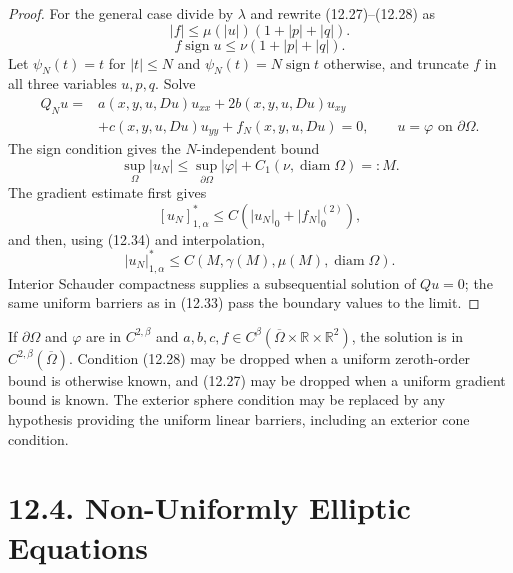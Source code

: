 \begin{proof}
For the general case divide by $\lambda$ and rewrite (12.27)--(12.28) as
\begin{equation}
|f|\le\mu(|u|)(1+|p|+|q|).
\tag{12.34}
\end{equation}
\begin{equation}
f\operatorname{sign}u\le\nu(1+|p|+|q|).
\tag{12.35}
\end{equation}
Let $\psi_N(t)=t$ for $|t|\le N$ and
$\psi_N(t)=N\operatorname{sign}t$ otherwise, and truncate $f$ in all three
variables $u,p,q$.  Solve
\begin{equation}\tag{12.36}
\begin{aligned}
Q_Nu={}&a(x,y,u,Du)u_{xx}+2b(x,y,u,Du)u_{xy}\\
&+c(x,y,u,Du)u_{yy}+f_N(x,y,u,Du)=0,
\qquad u=\varphi\text{ on }\partial\Omega.
\end{aligned}
\end{equation}
The sign condition gives the $N$-independent bound
\begin{equation}\tag{12.37}
\sup_\Omega|u_N|
\le\sup_{\partial\Omega}|\varphi|
+C_1(\nu,\operatorname{diam}\Omega)=:M.
\end{equation}
The gradient estimate first gives
\begin{equation}\tag{12.38}
[u_N]^*_{1,\alpha}
\le C\left(|u_N|_0+|f_N|_0^{(2)}\right),
\end{equation}
and then, using (12.34) and interpolation,
\begin{equation}\tag{12.39}
|u_N|^*_{1,\alpha}
\le C(M,\gamma(M),\mu(M),\operatorname{diam}\Omega).
\end{equation}
Interior Schauder compactness supplies a subsequential solution of $Qu=0$;
the same uniform barriers as in (12.33) pass the boundary values to the
limit.
\end{proof}

If $\partial\Omega$ and $\varphi$ are in $C^{2,\beta}$ and
$a,b,c,f\in C^\beta(\overline\Omega\times\mathbb R\times\mathbb R^2)$, the
solution is in $C^{2,\beta}(\overline\Omega)$.  Condition (12.28) may be
dropped when a uniform zeroth-order bound is otherwise known, and (12.27)
may be dropped when a uniform gradient bound is known.  The exterior sphere
condition may be replaced by any hypothesis providing the uniform linear
barriers, including an exterior cone condition.

\section*{12.4. Non-Uniformly Elliptic Equations}

